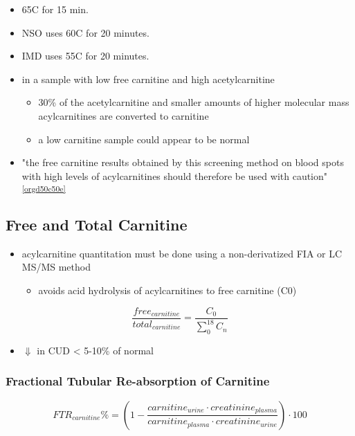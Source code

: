 \documentclass[12pt]{scrartcl}
\begin{document}
\begin{itemize}
\item 65\degree{}C for 15 min.
\item NSO uses 60\degree{}C for 20 minutes.
\item IMD uses 55\degree{}C for 20 minutes.

\item in a sample with low free carnitine and high acetylcarnitine
\begin{itemize}
\item 30\% of the acetylcarnitine and smaller amounts of higher
molecular mass acylcarnitines are converted to carnitine
\item a low carnitine sample could appear to be normal
\end{itemize}
\item "the free carnitine results obtained by this screening method on
blood spots with high levels of acylcarnitines should therefore be
used with caution" \textsuperscript{\ref{orgd50c50e}}
\end{itemize}


\subsection{Free and Total Carnitine}
\label{sec:org30dd6e6}
\begin{itemize}
\item acylcarnitine quantitation must be done using a non-derivatized FIA
or LC MS/MS method
\begin{itemize}
\item avoids acid hydrolysis of acylcarnitines to free carnitine (C0)
\end{itemize}
\end{itemize}

\[
\frac{free_{carnitine}}{total_{carnitine}} = \frac{C_0}{\sum_{0}^{18} C_n}
\]

\begin{itemize}
\item \(\Downarrow\) in CUD \textless{} 5-10\% of normal
\end{itemize}


\subsubsection{Fractional Tubular Re-absorption of Carnitine}
\label{sec:org3debc77}

\begin{equation*}
FTR_{carnitine}\% = \left( 1 -  \frac{carnitine_{urine} \cdot creatinine_{plasma}}{carnitine_{plasma} \cdot creatinine_{urine}}\right) \cdot 100
\end{equation*}
\end{document}
